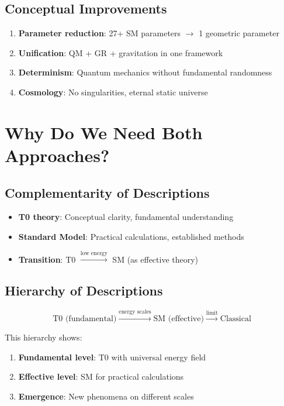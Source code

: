 	\subsection{Conceptual Improvements}
	
	\begin{enumerate}
		\item \textbf{Parameter reduction}: 27+ SM parameters $\to$ 1 geometric parameter
		\item \textbf{Unification}: QM + GR + gravitation in one framework
		\item \textbf{Determinism}: Quantum mechanics without fundamental randomness
		\item \textbf{Cosmology}: No singularities, eternal static universe
	\end{enumerate}
	
	\section{Why Do We Need Both Approaches?}
	
	\subsection{Complementarity of Descriptions}
	
	\begin{tcolorbox}[colback=yellow!5!white,colframe=yellow!75!black,title=Fundamental Complementarity]
		\begin{itemize}
			\item \textbf{T0 theory}: Conceptual clarity, fundamental understanding
			\item \textbf{Standard Model}: Practical calculations, established methods
			\item \textbf{Transition}: T0 $\xrightarrow{\text{low energy}}$ SM (as effective theory)
		\end{itemize}
	\end{tcolorbox}
	
	\subsection{Hierarchy of Descriptions}
	
	\begin{equation}
		\text{T0 (fundamental)} \xrightarrow{\text{energy scales}} \text{SM (effective)} \xrightarrow{\text{limit}} \text{Classical}
	\end{equation}
	
	This hierarchy shows:
	\begin{enumerate}
		\item \textbf{Fundamental level}: T0 with universal energy field
		\item \textbf{Effective level}: SM for practical calculations
		\item \textbf{Emergence}: New phenomena on different scales
	\end{enumerate}
	
